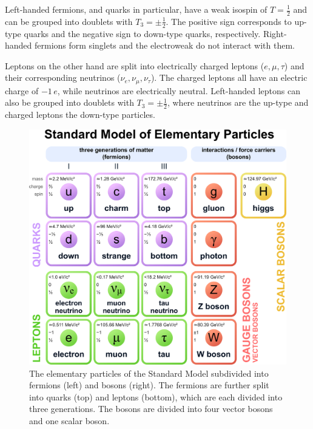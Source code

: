 \documentclass[bachelor,oneside, BCOR10mm,
			ngerman,english  %
]{GAUBM}
\begin{document}
Left-handed fermions, and quarks in particular, have a weak isospin of $T=\frac{1}{2}$ and can be grouped into doublets with $T_3=\pm\frac{1}{2}$. The positive sign corresponds to up-type quarks and the negative sign to down-type quarks, respectively. Right-handed fermions form singlets and the electroweak \wbosons do not interact with them.

Leptons on the other hand are split into electrically charged leptons ($e, \mu, \tau$) and their corresponding neutrinos ($\nu_e, \nu_\mu, \nu_\tau$). The charged leptons all have an electric charge of $-1\,e$, while neutrinos are electrically neutral. Left-handed leptons can also be grouped into doublets with $T_3=\pm\frac{1}{2}$, where neutrinos are the up-type and charged leptons the down-type particles.

\begin{figure}[ht]
	\centering
	\includegraphics[width=.75\textwidth]{figures/theory/standard_model.eps}
	\caption{The elementary particles of the Standard Model subdivided into fermions (left) and bosons (right). The fermions are further split into quarks (top) and leptons (bottom), which are each divided into three generations. The bosons are divided into four vector bosons and one scalar boson.}
	\label{fig:standard_model}
\end{figure}
\end{document}
